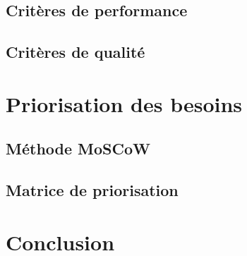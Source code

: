 
\subsection{Critères de performance}


\subsection{Critères de qualité}


\section{Priorisation des besoins}


\subsection{Méthode MoSCoW}


\subsection{Matrice de priorisation}


\section{Conclusion}


